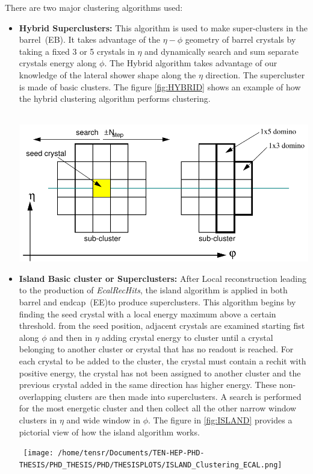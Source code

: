  There are two major clustering algorithms used:
\begin{itemize}
\item \textbf{Hybrid Superclusters:} This algorithm is used to make super-clusters in the barrel~(EB). It takes advantage of the $\eta - \phi$ geometry of barrel crystals by taking a fixed 3 or 5 crystals in $\eta$ and dynamically search and sum separate crystals energy along $\phi$. The Hybrid algorithm takes advantage of our knowledge of the lateral shower shape along the $\eta$ direction. The supercluster is made of basic clusters.
The figure \ref{fig:HYBRID} shows an example of how the hybrid clustering algorithm performs clustering.
\begin{center}
\centering
\mbox{
\includegraphics[scale=0.5]{THESISPLOTS/Hybrid_Clustering_ECAL.png}}
 \label{fig:HYBRID}
\end{center}

\item \textbf{Island Basic cluster or Superclusters:} After Local reconstruction leading to the production of \textit{EcalRecHits}, the island algorithm is applied in both barrel and endcap~(EE)to produce superclusters. This algorithm begins by finding the seed crystal with a local energy maximum above a certain threshold. from the seed position, adjacent crystals are examined starting fist along $\phi$ and then in $\eta$ adding crystal energy to cluster until a crystal belonging to another cluster or crystal that has no readout is reached. For each crystal to be added to the cluster,  the crystal must contain a rechit with positive energy, the crystal has not been assigned to another cluster and the previous crystal added in the same direction has higher energy. These non-overlapping clusters are then made into superclusters. A search is performed for the most energetic cluster and then collect all the other narrow window clusters in $\eta$ and wide window in $\phi$. The figure in \ref{fig:ISLAND} provides a pictorial view of how the island algorithm works.
\begin{center}
\centering
\mbox{
\texttt{[image: /home/tensr/Documents/TEN-HEP-PHD-THESIS/PHD\_THESIS/PHD/THESISPLOTS/ISLAND\_Clustering\_ECAL.png]}
}
 \label{fig:ISLAND}
\end{center}
 

\end{itemize}
